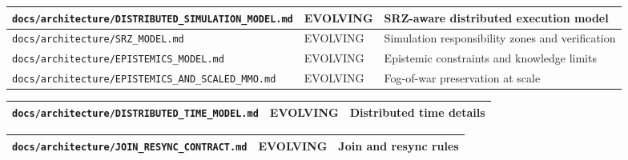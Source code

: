 \documentclass[9pt,a4paper,openany]{book}
\newcommand{\toprule}{\hline}
\newcommand{\midrule}{\hline}
\newcommand{\bottomrule}{\hline}
\begin{document}
\begin{center}
{\small\renewcommand{\arraystretch}{1.18}
\begin{tabularx}{\linewidth}{@{}>{\raggedright\arraybackslash}X >{\raggedright\arraybackslash}X >{\raggedright\arraybackslash}X@{}}
\toprule
\textbf{\texttt{docs/\allowbreak{}architecture/\allowbreak{}DISTRIBUTED\_\allowbreak{}SIMULATION\_\allowbreak{}MODEL.\allowbreak{}md}} & \textbf{EVOLVING} & \textbf{SRZ-\allowbreak{}aware distributed execution model} \\
\midrule
\texttt{docs/\allowbreak{}architecture/\allowbreak{}SRZ\_\allowbreak{}MODEL.\allowbreak{}md} & EVOLVING & Simulation responsibility zones and verification \\
\texttt{docs/\allowbreak{}architecture/\allowbreak{}EPISTEMICS\_\allowbreak{}MODEL.\allowbreak{}md} & EVOLVING & Epistemic constraints and knowledge limits \\
\texttt{docs/\allowbreak{}architecture/\allowbreak{}EPISTEMICS\_\allowbreak{}AND\_\allowbreak{}SCALED\_\allowbreak{}MMO.\allowbreak{}md} & EVOLVING & Fog-\allowbreak{}of-\allowbreak{}war preservation at scale \\
\bottomrule
\end{tabularx}
}
\end{center}


\begin{center}
{\small\renewcommand{\arraystretch}{1.18}
\begin{tabularx}{\linewidth}{@{}>{\raggedright\arraybackslash}X >{\raggedright\arraybackslash}X >{\raggedright\arraybackslash}X@{}}
\toprule
\textbf{\texttt{docs/\allowbreak{}architecture/\allowbreak{}DISTRIBUTED\_\allowbreak{}TIME\_\allowbreak{}MODEL.\allowbreak{}md}} & \textbf{EVOLVING} & \textbf{Distributed time details} \\
\midrule
\bottomrule
\end{tabularx}
}
\end{center}


\begin{center}
{\small\renewcommand{\arraystretch}{1.18}
\begin{tabularx}{\linewidth}{@{}>{\raggedright\arraybackslash}X >{\raggedright\arraybackslash}X >{\raggedright\arraybackslash}X@{}}
\toprule
\textbf{\texttt{docs/\allowbreak{}architecture/\allowbreak{}JOIN\_\allowbreak{}RESYNC\_\allowbreak{}CONTRACT.\allowbreak{}md}} & \textbf{EVOLVING} & \textbf{Join and resync rules} \\
\midrule
\bottomrule
\end{tabularx}
}
\end{center}
\end{document}
